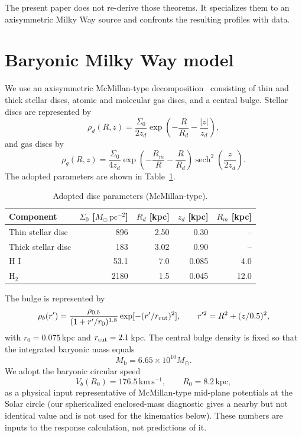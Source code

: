 \documentclass[11pt]{article}
\theoremstyle{definition}
\theoremstyle{remark}
\newcommand{\Msun}{M_\odot}
\newcommand{\kms}{\mathrm{km\,s^{-1}}}
\newcommand{\Mb}{M_{\mathrm{b}}}
\begin{document}
The present paper does not re-derive those theorems.
It specializes them to an axisymmetric Milky Way source and confronts the resulting profiles with data.

\section{Baryonic Milky Way model}
\label{sec:baryons}
We use an axisymmetric McMillan-type decomposition~\cite{McMillan2017} consisting of thin and thick stellar discs, atomic and molecular gas discs, and a central bulge.
Stellar discs are represented by
\begin{equation}
\rho_d(R,z)=\frac{\Sigma_0}{2z_d}\exp\!\left(-\frac{R}{R_d}-\frac{|z|}{z_d}\right),
\end{equation}
and gas discs by
\begin{equation}
\rho_g(R,z)=\frac{\Sigma_0}{4z_d}\exp\!\left(-\frac{R_m}{R}-\frac{R}{R_d}\right)\operatorname{sech}^2\!\left(\frac{z}{2z_d}\right).
\end{equation}
The adopted parameters are shown in Table~\ref{tab:disc}.
\begin{table}[h]
\centering
\caption{Adopted disc parameters (McMillan-type).}
\label{tab:disc}
\begin{tabular}{lrrrr}
\toprule
Component & $\Sigma_0$ [$\Msun\,\mathrm{pc}^{-2}$] & $R_d$ [kpc] & $z_d$ [kpc] & $R_m$ [kpc]\\
\midrule
Thin stellar disc & 896 & 2.50 & 0.30 & --\\
Thick stellar disc & 183 & 3.02 & 0.90 & --\\
H I & 53.1 & 7.0 & 0.085 & 4.0\\
H$_2$ & 2180 & 1.5 & 0.045 & 12.0\\
\bottomrule
\end{tabular}
\end{table}
The bulge is represented by
\begin{equation}
\rho_b(r')=\frac{\rho_{0,b}}{(1+r'/r_0)^{1.8}}
\exp[-(r'/r_{\rm cut})^2],\qquad
r'^2=R^2+(z/0.5)^2,
\end{equation}
with $r_0=0.075\,$kpc and $r_{\rm cut}=2.1\,$kpc.
The central bulge density is fixed so that the integrated baryonic mass equals
\begin{equation}
\Mb=6.65\times10^{10}\Msun.
\end{equation}
We adopt the baryonic circular speed
\begin{equation}
V_b(R_0)=176.5\,\kms,
\qquad R_0=8.2\,\mathrm{kpc},
\end{equation}
as a physical input representative of McMillan-type mid-plane potentials at the Solar circle (our sphericalized enclosed-mass diagnostic gives a nearby but not identical value and is not used for the kinematics below).
These numbers are inputs to the response calculation, not predictions of it.
\end{document}

